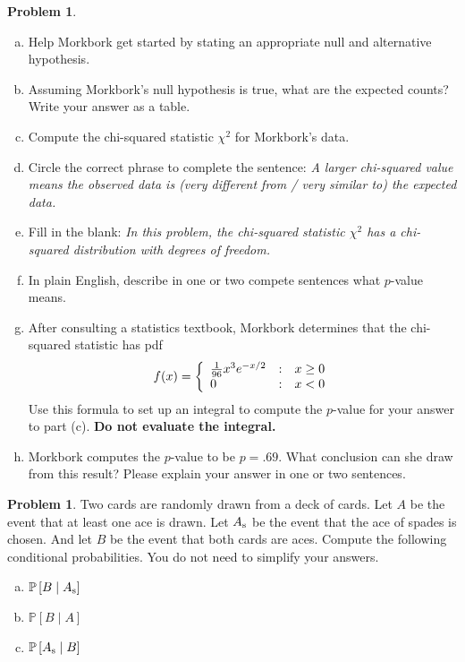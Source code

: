 \documentclass[10pt]{article}
\theoremstyle{definition}
\newtheorem{problem}[theorem]{Problem}
\newcommand{\1}[1]{\textbf{1}_{\left[#1\right]}} %
\def\P{\mathbb{P}} %
\begin{document}
\begin{problem}
  \begin{enumerate}[(a)]
    \item Help Morkbork get started by stating an appropriate null and
    alternative hypothesis.
    \item Assuming Morkbork's null hypothesis is true, what are the expected
    counts? Write your answer as a table.
    \item Compute the chi-squared statistic $\chi^{2}$ for Morkbork's data.
    \item Circle the correct phrase to complete the sentence: \textit{A larger
      chi-squared value means the observed data is (very different from / very
      similar to) the expected data.}
    \item Fill in the blank: \textit{In this problem, the chi-squared
      statistic $\chi^{2}$ has a chi-squared distribution with
      \underline{\phantom \quad \quad \quad} degrees of freedom.}
    \item In plain English, describe in one or two compete sentences what
    $p$-value means.
    \item After consulting a statistics textbook, Morkbork determines that the
    chi-squared statistic has pdf
    \begin{equation*}
      f(x) = \left\{ \begin{array}{l@{\quad:\quad}l}\frac{1}{96}x^{3}e^{-x/2} & x \geq 0\\ 0& x<0\end{array}\right.
    \end{equation*}
    Use this formula to set up an integral to compute the $p$-value for your
    answer to part (c). \textbf{Do not evaluate the integral.}
    \item Morkbork computes the $p$-value to be $p=.69$. What conclusion can
    she draw from this result? Please explain your answer in one or two
    sentences.  
  \end{enumerate}  
\end{problem}



\begin{problem}%
  Two cards are randomly drawn from a deck of cards. Let $A$ be the event that
  at least one ace is drawn. Let $A_{\rm s}$ be the event that the ace of
  spades is chosen. And let $B$ be the event that both cards are aces. Compute
  the following conditional probabilities. You do not need to simplify your
  answers.
  \begin{enumerate}[(a)]
    \item $\P\left[B\mid A_{\rm s} \right]$ 
    \item $\P\left[B\mid A \right]$ 
    \item $\P\left[A_{\rm s} \mid B \right]$ 
  \end{enumerate}
\end{problem}
\end{document}
